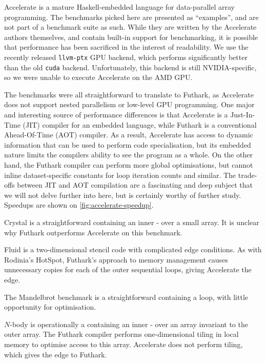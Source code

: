 Accelerate is a mature Haskell-embedded language for data-parallel
array programming.  The benchmarks picked here are presented as
``examples'', and are not part of a benchmark suite as such.  While
they are written by the Accelerate authors themselves, and contain
built-in support for benchmarking, it is possible that performance has
been sacrificed in the interest of readability.  We use the recently
released \texttt{llvm-ptx} GPU backend, which performs significantly
better than the old \texttt{cuda} backend.  Unfortunately, this
backend is still NVIDIA-specific, so we were unable to execute
Accelerate on the AMD GPU.

The benchmarks were all straightforward to translate to Futhark, as
Accelerate does not support nested parallelism or low-level GPU
programming.  One major and interesting source of performance
differences is that Accelerate is a Just-In-Time (JIT) compiler for an
embedded language, while Futhark is a conventional Ahead-Of-Time (AOT)
compiler.  As a result, Accelerate has access to dynamic information
that can be used to perform code specialisation, but its embedded
nature limits the compilers ability to see the program as a whole.  On
the other hand, the Futhark compiler can perform more global
optimisations, but cannot inline dataset-specific constants for loop
iteration counts and similar.  The trade-offs between JIT and AOT
compilation are a fascinating and deep subject that we will not delve
further into here, but is certainly worthy of further study.  Speedups
are shown on \cref{fig:accelerate-speedup}.

Crystal is a straightforward  containing an inner
- over a small array.  It is unclear why
Futhark outperforms Accelerate on this benchmark.

Fluid is a two-dimensional stencil code with complicated edge
conditions.  As with Rodinia's HotSpot, Futhark's approach to memory
management causes unnecessary copies for each of the outer sequential
loops, giving Accelerate the edge.

The Mandelbrot benchmark is a straightforward  containing a
 loop, with little opportunity for optimisation.

$N$-body is operationally a  containing an inner
- over an array invariant to the outer array.  The
Futhark compiler performs one-dimensional tiling in local memory to
optimise access to this array.  Accelerate does not perform tiling,
which gives the edge to Futhark.

